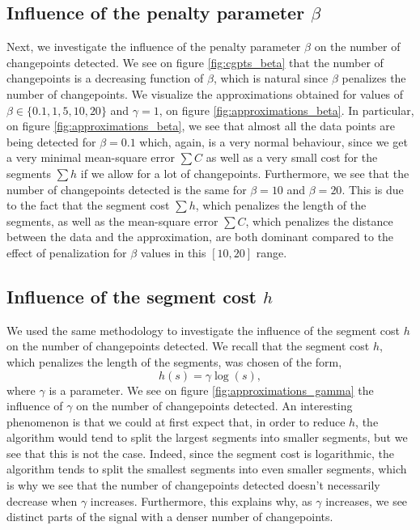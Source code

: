 \documentclass[11pt]{article}
\begin{document}
\subsection{Influence of the penalty parameter $\beta$}
Next, we investigate the influence of the penalty parameter $\beta$ on the number of changepoints detected. We see on figure \ref{fig:cgpts_beta} that the number of changepoints is a decreasing function of $\beta$, which is natural since $\beta$ penalizes the number of changepoints. We visualize the approximations obtained for values of $\beta \in \{0.1, 1, 5, 10, 20\}$ and $\gamma = 1$, on figure \ref{fig:approximations_beta}.
\jump
In particular, on figure \ref{fig:approximations_beta}, we see that almost all the data points are being detected for $\beta=0.1$ which, again, is a very normal behaviour, since we get a very minimal mean-square error $\sum C$ as well as a very small cost for the segments $\sum h$ if we allow for a lot of changepoints.
\jump
Furthermore, we see that the number of changepoints detected is the same for $\beta = 10$ and $\beta = 20$. This is due to the fact that the segment cost $\sum h$, which penalizes the length of the segments, as well as the mean-square error $\sum C$, which penalizes the distance between the data and the approximation, are both dominant compared to the effect of penalization for $\beta$ values in this $[10,20]$ range.

\subsection{Influence of the segment cost $h$}
We used the same methodology to investigate the influence of the segment cost $h$ on the number of changepoints detected. We recall that the segment cost $h$, which penalizes the length of the segments, was chosen of the form,
$$ h(s) = \gamma \log(s), $$ where $\gamma$ is a parameter.
\jump
We see on figure \ref{fig:approximations_gamma} the influence of $\gamma$ on the number of changepoints detected. An interesting phenomenon is that we could at first expect that, in order to reduce $h$, the algorithm would tend to split the largest segments into smaller segments, but we see that this is not the case. Indeed, since the segment cost is logarithmic, the algorithm tends to split the smallest segments into even smaller segments, which is why we see that the number of changepoints detected doesn't necessarily decrease when $\gamma$ increases. Furthermore, this explains why, as $\gamma$ increases, we see distinct parts of the signal with a denser number of changepoints.
\end{document}
